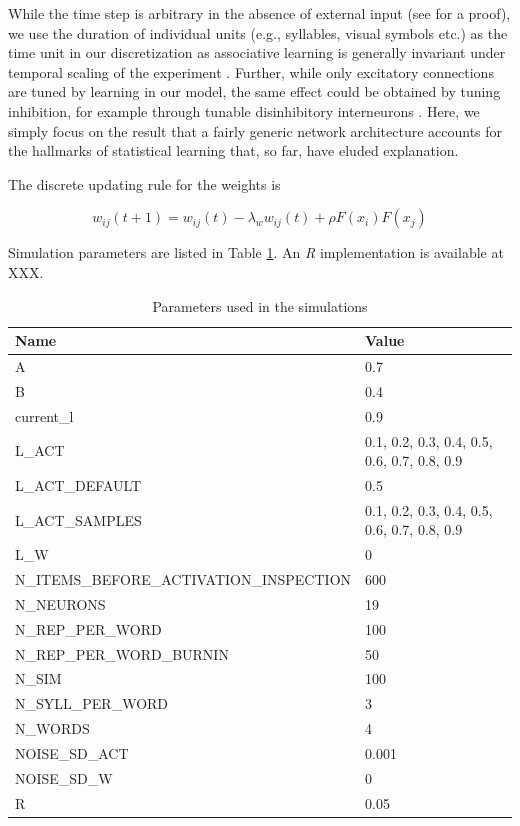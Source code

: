 \documentclass[
]{article}
\begin{document}
While the time step is arbitrary in the absence of external input (see
\citep{Endress-Catastrophic-Interference} for a proof), we use the
duration of individual units (e.g., syllables, visual symbols etc.) as
the time unit in our discretization as associative learning is generally
invariant under temporal scaling of the experiment
\citep{Gallistel2000PsychRev, Gallistel2001b}. Further, while only
excitatory connections are tuned by learning in our model, the same
effect could be obtained by tuning inhibition, for example through
tunable disinhibitory interneurons \citep{Letzkus2011}. Here, we simply
focus on the result that a fairly generic network architecture accounts
for the hallmarks of statistical learning that, so far, have eluded
explanation.

The discrete updating rule for the weights is

\[
w_{ij} (t+1) = w_{ij} (t) - \lambda_w w_{ij} (t) + \rho F(x_i) F(x_j) 
\]

Simulation parameters are listed in Table \ref{tab:params}. An \emph{R}
implementation is available at XXX.

\begin{table}

\caption{\label{tab:list-parameters2}\label{tab:params}Parameters used in the simulations}
\centering
\begin{tabular}[t]{ll}
\toprule
Name & Value\\
\midrule
A & 0.7\\
B & 0.4\\
current\_l & 0.9\\
L\_ACT & 0.1, 0.2, 0.3, 0.4, 0.5, 0.6, 0.7, 0.8, 0.9\\
L\_ACT\_DEFAULT & 0.5\\
\addlinespace
L\_ACT\_SAMPLES & 0.1, 0.2, 0.3, 0.4, 0.5, 0.6, 0.7, 0.8, 0.9\\
L\_W & 0\\
N\_ITEMS\_BEFORE\_ACTIVATION\_INSPECTION & 600\\
N\_NEURONS & 19\\
N\_REP\_PER\_WORD & 100\\
\addlinespace
N\_REP\_PER\_WORD\_BURNIN & 50\\
N\_SIM & 100\\
N\_SYLL\_PER\_WORD & 3\\
N\_WORDS & 4\\
NOISE\_SD\_ACT & 0.001\\
\addlinespace
NOISE\_SD\_W & 0\\
R & 0.05\\
\bottomrule
\end{tabular}
\end{table}
\end{document}
